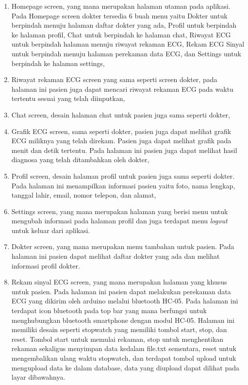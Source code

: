 \begin{enumerate}
	\vspace{-2mm}
	\item Homepage screen, yang mana merupakan halaman utaman pada aplikasi. Pada Homepage screen dokter tersedia 6 buah menu yaitu Dokter untuk berpindah menuju halaman daftar dokter yang ada, Profil untuk berpindah ke halaman profil, Chat untuk berpindah ke halaman chat, Riwayat ECG untuk berpindah halaman menuju riwayat rekaman ECG, Rekam ECG Sinyal untuk berpindah menuju halaman perekaman data ECG, dan Settings untuk berpindah ke halaman settings,
	\vspace{-2mm}
	\item Riwayat rekaman ECG screen yang sama seperti screen dokter, pada halaman ini pasien juga dapat mencari riwayat rekaman ECG pada waktu tertentu sesuai yang telah diinputkan,
	\vspace{-2mm}
	\item Chat screen, desain halaman chat untuk pasien juga sama seperti dokter,
	\vspace{-2mm}
	\item Grafik ECG screen, sama seperti dokter, pasien juga dapat melihat grafik ECG miliknya yang telah direkam. Pasien juga dapat melihat grafik pada menit dan detik tertentu. Pada halaman ini pasien juga dapat melihat hasil diagnosa yang telah ditambahkan oleh dokter,
	\vspace{-2mm}
	\item Profil screen, desain halaman profil untuk pasien juga sama seperti dokter. Pada halaman ini menampilkan informasi pasien yaitu foto, nama lengkap, tanggal lahir, email, nomor telepon, dan alamat,
	\vspace{-2mm}
	\item Settings screen, yang mana merupakan halaman yang berisi menu untuk mengubah informasi pada halaman profil dan juga terdapat menu \textit{logout} untuk keluar dari aplikasi.
	\vspace{-2mm}
	\item Dokter screen, yang mana merupakan menu tambahan untuk pasien. Pada halaman ini pasien dapat melihat daftar dokter yang ada dan melihat informasi profil dokter.
	\vspace{-2mm}
	\item Rekam sinyal ECG screen, yang mana merupakan halaman yang khusus untuk pasien. Pada halaman ini pasien dapat melakukan perekaman data ECG yang dikirim oleh arduino melalui bluetooth HC-05. Pada halaman ini terdapat icon bluetooth pada top bar yang mana berfungsi untuk menghubungkan bluetooth smartphone dengan modul HC-05. Halaman ini memiliki desain seperti stopwatch yang memiliki tombol start, stop, dan reset. Tombol start untuk memulai rekaman, stop untuk menghentikan rekaman sekaligus menyimpan data kedalam file.txt sementara, reset untuk mengembalikan ulang waktu stopwatch, dan terdapat tombol upload untuk mengupload data ke dalam database, data yang diupload dapat dilihat pada layar dibawahnya.
\end{enumerate}
\vspace{1ex}

